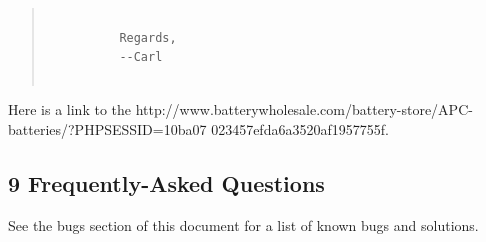 \begin{quote}
\footnotesize
\begin{verbatim}
          
          Regards,
          --Carl
     
\end{verbatim}
\normalsize

\end{quote}

Here is a link to the 
{http://www.batterywholesale.com/battery-store/APC-batteries/?PHPSESSID=10ba07%
023457efda6a3520af1957755f}. 

\label{Frequently_002dAsked-Questions}

\subsection*{9 Frequently-Asked Questions}

\label{index-FAQ-147}
See the bugs section of this document for a list of known bugs and solutions. 


